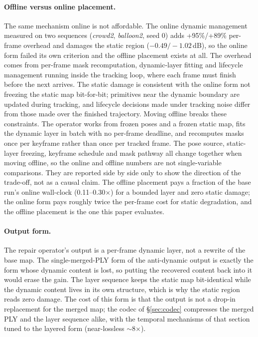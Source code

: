 \documentclass[10pt,twocolumn,letterpaper]{article}
\newcommand{\gate}[1]{{#1}} %
\begin{document}
\paragraph{Offline versus online placement.}
The same mechanism online is not affordable. The online dynamic management measured on two sequences
(\emph{crowd2}, \emph{balloon2}, seed 0) adds \gate{+95\%/+89\%} per-frame overhead and damages the static region
(\gate{$-0.49/-1.02$}\,dB), so the online form failed its own criterion and
the offline placement exists at all. %
The overhead comes from per-frame mask recomputation, dynamic-layer fitting and
lifecycle management running inside the tracking loop, where each frame must finish
before the next arrives. The static damage is consistent with the online form not
freezing the static map bit-for-bit; primitives near the dynamic boundary are updated
during tracking, and lifecycle decisions made under tracking noise differ from those
made over the finished trajectory. Moving offline breaks these constraints. The
operator works from frozen poses and a frozen static map, fits the dynamic layer in
batch with no per-frame deadline, and recomputes masks once per keyframe rather than
once per tracked frame. The pose source, static-layer freezing, keyframe schedule and
mask pathway all change together when moving offline, so the online and offline
numbers are not single-variable comparisons. They are reported side by side only to
show the direction of the trade-off, not as a causal claim. The offline placement
pays a fraction of the base run's online wall-clock (\gate{0.11--0.30$\times$}) for a bounded
layer and zero static damage; the online form pays roughly twice the per-frame cost for
static degradation, and the offline placement is the one this paper evaluates.

\paragraph{Output form.}
The repair operator's output is a per-frame dynamic layer, not a rewrite of the base
map. The single-merged-PLY form of the anti-dynamic
output is exactly the form whose dynamic content is lost, so putting the
recovered content back into it would erase the gain. The layer sequence keeps the
static map bit-identical while the dynamic content lives in its own structure, which
is why the static region reads zero damage. The cost of this form is that the output
is not a drop-in replacement for the merged map; the codec of \S\ref{sec:codec}
compresses the merged PLY and the layer sequence alike, with the temporal mechanisms
of that section tuned to the layered form (near-lossless \gate{$\sim$8$\times$}). %
\end{document}
